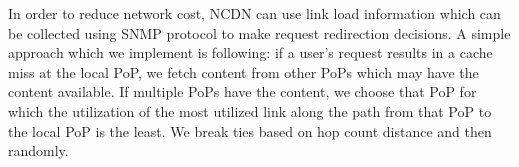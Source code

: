 {In order to reduce network cost, NCDN can use link load information which can be collected using SNMP protocol to make request redirection decisions. A simple approach which we implement is following:  if a user's request results in a cache miss at the local PoP, we fetch content from other PoPs  which may have the content available. If multiple PoPs have the content, we choose that PoP for which the utilization of the most utilized link  along the path from that PoP to the local PoP is the least. We break ties based on hop count distance and then randomly.

}






